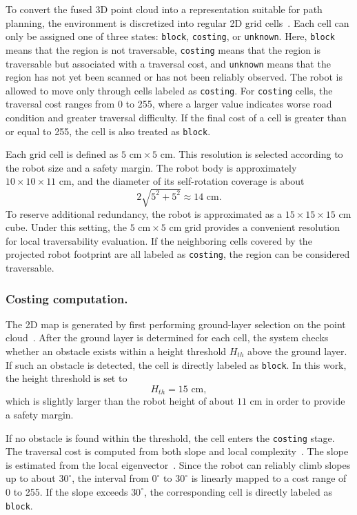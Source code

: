 \documentclass[12pt]{interim_report}
\begin{document}
To convert the fused 3D point cloud into a representation suitable for path planning, the environment is discretized into regular 2D grid cells~\cite{elfes1989occupancy,gu2008traversability}. Each cell can only be assigned one of three states: \texttt{block}, \texttt{costing}, or \texttt{unknown}. Here, \texttt{block} means that the region is not traversable, \texttt{costing} means that the region is traversable but associated with a traversal cost, and \texttt{unknown} means that the region has not yet been scanned or has not been reliably observed. The robot is allowed to move only through cells labeled as \texttt{costing}. For \texttt{costing} cells, the traversal cost ranges from 0 to 255, where a larger value indicates worse road condition and greater traversal difficulty. If the final cost of a cell is greater than or equal to 255, the cell is also treated as \texttt{block}.

Each grid cell is defined as \(5\text{ cm} \times 5\text{ cm}\). This resolution is selected according to the robot size and a safety margin. The robot body is approximately \(10 \times 10 \times 11\text{ cm}\), and the diameter of its self-rotation coverage is about
\[
2\sqrt{5^2+5^2}\approx 14\text{ cm}.
\]
To reserve additional redundancy, the robot is approximated as a \(15 \times 15 \times 15\text{ cm}\) cube. Under this setting, the \(5\text{ cm} \times 5\text{ cm}\) grid provides a convenient resolution for local traversability evaluation. If the neighboring cells covered by the projected robot footprint are all labeled as \texttt{costing}, the region can be considered traversable.

\subsubsection{Costing computation.}
The 2D map is generated by first performing ground-layer selection on the point cloud~\cite{meng2018terrain}. After the ground layer is determined for each cell, the system checks whether an obstacle exists within a height threshold \(H_{th}\) above the ground layer. If such an obstacle is detected, the cell is directly labeled as \texttt{block}. In this work, the height threshold is set to
\[
H_{th}=15\text{ cm},
\]
which is slightly larger than the robot height of about \(11\text{ cm}\) in order to provide a safety margin.

If no obstacle is found within the threshold, the cell enters the \texttt{costing} stage. The traversal cost is computed from both slope and local complexity~\cite{gu2008traversability,meng2018terrain}. The slope is estimated from the local eigenvector~\cite{weinmann2013feature}. Since the robot can reliably climb slopes up to about \(30^\circ\), the interval from \(0^\circ\) to \(30^\circ\) is linearly mapped to a cost range of 0 to 255. If the slope exceeds \(30^\circ\), the corresponding cell is directly labeled as \texttt{block}.
\end{document}
